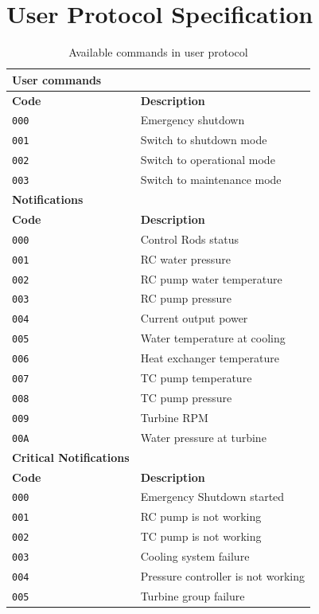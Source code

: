 \documentclass[10pt,a4paper]{report}
\begin{document}
\appendix
\chapter{User Protocol Specification} \label{app:protocol}

\begin{table}[htb]
\centering
\begin{tabular}{|l l|}
\hline
\textbf{User commands} & \\ \hline \hline
\textbf{Code} & \textbf{Description}\\
\hline
\texttt{000} & Emergency shutdown \\
\texttt{001} & Switch to shutdown mode \\
\texttt{002} & Switch to operational mode \\
\texttt{003} & Switch to maintenance mode \\
\hline

\textbf{Notifications} & \\ \hline \hline
\textbf{Code} & \textbf{Description}\\
\hline
\texttt{000} & Control Rods status \\
\texttt{001} & RC water pressure \\
\texttt{002} & RC pump water temperature \\ 
\texttt{003} & RC pump pressure \\
\texttt{004} & Current output power \\
\texttt{005} & Water temperature at cooling\\
\texttt{006} & Heat exchanger temperature  \\
\texttt{007} & TC pump temperature \\
\texttt{008} & TC pump pressure \\
\texttt{009} & Turbine RPM \\
\texttt{00A} & Water pressure at turbine \\
\hline

\textbf{Critical Notifications} & \\ \hline \hline
\textbf{Code} & \textbf{Description}\\
\hline
\texttt{000} & Emergency Shutdown started \\
\texttt{001} & RC pump is not working \\
\texttt{002} & TC pump is not working \\ 
\texttt{003} & Cooling system failure \\
\texttt{004} & Pressure controller is not working \\
\texttt{005} & Turbine group failure \\
\hline

\end{tabular}
\caption{Available commands in user protocol}
\label{pktcmd}
\end{table}
\end{document}
